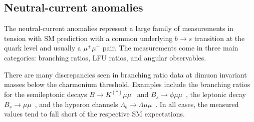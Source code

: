 \subsection{Neutral-current anomalies}

The neutral-current anomalies represent a large family of measurements in
tension with SM prediction with a common underlying $b\to s$ transition at the
quark level and usually a $\mu^{+}\mu^{-}$ pair. The measurements come in three
main categories: branching ratios, LFU ratios, and angular observables.

There are many discrepancies seen in branching ratio data at dimuon invariant
masses below the charmonium threshold. Examples include the branching ratios for
the semileptonic decays $B \to K^{(*)} \mu\mu$~\cite{Aaij:2014pli} and
$B_{s} \to \phi \mu\mu$~\cite{Aaij:2015esa}, the leptonic decay
$B_{s} \to \mu\mu$~\cite{CMS-PAS-BPH-16-004, Aaij:2012nna, Aaij:2017vad,
  Aaboud:2018mst}, and the hyperon channels
$\Lambda_{b} \to \Lambda \mu\mu$~\cite{Aaij:2015xza}. In all cases, the measured
values tend to fall short of the respective SM expectations.

